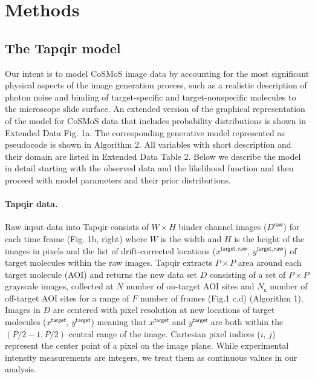 \section*{Methods}

\subsection*{The Tapqir model} 

Our intent is to model CoSMoS image data by accounting for the most significant physical aspects of the image generation process, such as a realistic description of photon noise and binding of target-specific and target-nonspecific molecules to the microscope slide surface. An extended version of the graphical representation of the model for CoSMoS data that includes probability distributions is shown in Extended Data Fig. 1a. The corresponding generative model represented as pseudocode is shown in Algorithm 2. All variables with short description and their domain are listed in Extended Data Table 2. Below we describe the model in detail starting with the observed data and the likelihood function and then proceed with model parameters and their prior distributions.

\paragraph{Tapqir data.} Raw input data into Tapqir consists of $W \times H$ binder channel images ($D^\mathsf{raw}$) for each time frame (Fig. 1b, right) where $W$ is the width and $H$ is the height of the images in pixels and the list of drift-corrected locations ($x^{\mathsf{target}, \mathsf{raw}}$, $y^{\mathsf{target}, \mathsf{raw}}$) of target molecules within the raw images. Tapqir extracts $P \times P$ area around each target molecule (AOI) and returns the new data set $D$ consisting of a set of $P \times P$ grayscale images, collected at $N$ number of on-target AOI sites and $N_\mathsf{c}$ number of off-target AOI sites for a range of $F$ number of frames (Fig.1 c,d) (Algorithm 1). Images in $D$ are centered with pixel resolution at new locations of target molecules ($x^\mathsf{target}$, $y^\mathsf{target}$) meaning that $x^\mathsf{target}$ and $y^\mathsf{target}$ are both within the $(P/2-1,P/2)$ central range of the image. Cartesian pixel indices ($i$, $j$) represent the center point of a pixel on the image plane. While experimental intensity measurements are integers, we treat them as continuous values in our analysis.

